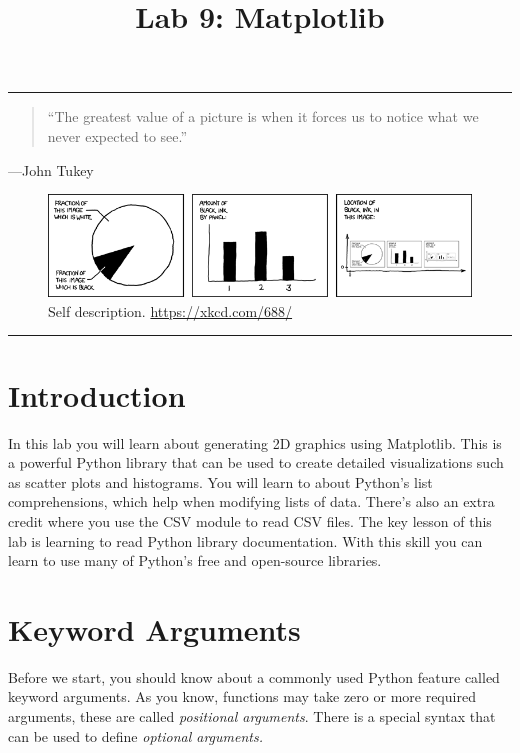 \documentclass[11pt]{cselabheader}
\title{Lab 9: Matplotlib}
\begin{document}
\maketitle
{}
\hrule

\begin{quote}
``The greatest value of a picture is when it forces us to notice what we
never expected to see.''
\end{quote}
\begin{flushright}
---John Tukey
\end{flushright}

\begin{figure}[H]
  \centering
  \includegraphics[width=\textwidth]{img/xkcd_self_description.png}
  \caption{Self description. \url{https://xkcd.com/688/}}
\end{figure}

\hrule

\pagebreak
\tableofcontents

\section*{Introduction}
In this lab you will learn about generating 2D graphics using
Matplotlib.  This is a powerful Python library that can be used to
create detailed visualizations such as scatter plots and
histograms. You will learn to about Python's list comprehensions,
which help when modifying lists of data.  There's also an extra credit
where you use the CSV module to read CSV files.  The key lesson of
this lab is learning to read Python library documentation. With this
skill you can learn to use many of Python's free and open-source
libraries.

\pagebreak
{}
\section{Keyword Arguments}
Before we start, you should know about a commonly used Python feature
called keyword arguments. As you know, functions may take zero or more
required arguments, these are called \textsl{positional arguments}.
There is a special syntax that can be used to define \textsl{optional
arguments.}
\end{document}
